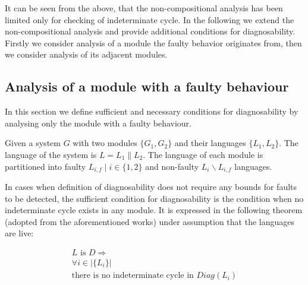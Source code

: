 \documentclass[a4paper, 10pt, conference]{ieeeconf} \IEEEoverridecommandlockouts
\begin{document}
It can be seen from the above, that the non-compositional analysis has
been limited only for checking of indeterminate cycle. In the following we
extend the non-compositional analysis and provide additional conditions for
diagnosability. Firstly we consider analysis of a module the faulty
behavior originates from, then we consider analysis of its adjacent modules.  


\subsection{Analysis of a module with a faulty behaviour}
In this section we define sufficient and necessary conditions for diagnosability
by analysing only the module with a faulty behaviour.

Given a system $G$ with two modules $\{G_1, G_2\}$ and
their languages $\{L_1, L_2\}$. The language of the system is $L = L_1 \parallel
L_2$. 
The language of each module is partitioned into faulty $L_{i,f}\mid i\in
\{1,2\}$ and non-faulty $L_i\backslash L_{i,f}$ languages.

In cases when definition of diagnosability does not require any bounds for
faults to be detected, the sufficient condition for diagnosability is the
condition when no indeterminate cycle exists in any module. 
It is expressed in the following theorem (adopted from the aforementioned works)
under assumption that the languages are live:
\begin{theorem}
\label{trm_sufficient_for_diag}
\begin{equation}
\begin{array}{l}
	L \textrm{ is }D \Rightarrow 
	\\[1ex]
	\forall i \in |\{L_i\}|
	\\[1ex]
	\textrm{there is no indeterminate cycle in } Diag(L_i)
\end{array}
\end{equation}
\end{theorem}
\end{document}
